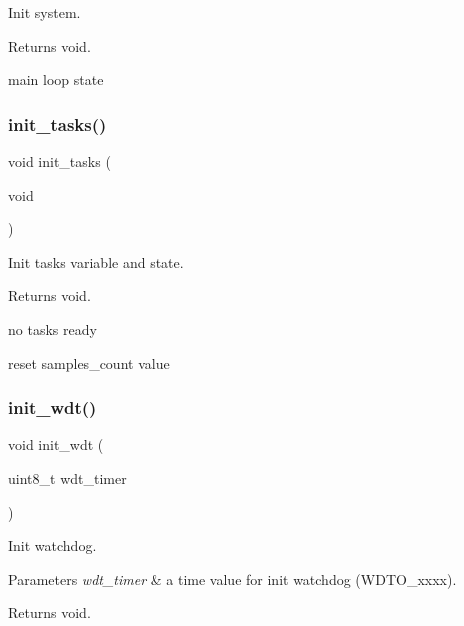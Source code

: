 Init system. 

\begin{DoxyReturn}{Returns}
void. 
\end{DoxyReturn}
main loop state \mbox{\label{i2c-th_8ino_ab4bf0a3d77da083f131d3fa35a37d2b1}} 
\subsubsection{\texorpdfstring{init\+\_\+tasks()}{init\_tasks()}}
{\footnotesize\ttfamily void init\+\_\+tasks (\begin{DoxyParamCaption}\item[{void}]{ }\end{DoxyParamCaption})}



Init tasks variable and state. 

\begin{DoxyReturn}{Returns}
void. 
\end{DoxyReturn}
no tasks ready

reset samples\+\_\+count value \mbox{\label{i2c-th_8ino_a980e73df66b14b1190bc25da430a4f12}} 
\subsubsection{\texorpdfstring{init\+\_\+wdt()}{init\_wdt()}}
{\footnotesize\ttfamily void init\+\_\+wdt (\begin{DoxyParamCaption}\item[{uint8\+\_\+t}]{wdt\+\_\+timer }\end{DoxyParamCaption})}



Init watchdog. 


\begin{DoxyParams}{Parameters}
{\em wdt\+\_\+timer} & a time value for init watchdog (W\+D\+T\+O\+\_\+xxxx). \\
\hline
\end{DoxyParams}
\begin{DoxyReturn}{Returns}
void. 
\end{DoxyReturn}
\mbox{\label{i2c-th_8ino_a2441543100bf8421f56edd622a2c1d9a}} 
